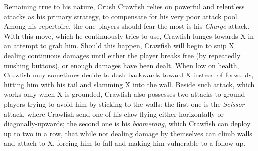 Remaining true to his nature, Crush Crawfish relies on powerful and relentless attacks as his primary strategy, to compensate for his  very poor attack pool. Among his repertoire, the one players should fear the most is his \emph{Charge} attack. With this move, which he continuously tries to use, Crawfish lunges towards X in an attempt to grab him. Should this happen, Crawfish will begin to snip X dealing continuous damages until either the player breaks free (by repeatedly mushing buttons), or enough damages have been dealt. When low on health, Crawfish may sometimes decide to dash backwards toward X instead of forwards, hitting him with his tail and slamming X into the wall. Beside such attack, which works only when X is grounded, Crawfish also possesses two attacks to ground players trying to avoid him by sticking to the walls: the first one is the \emph{Scissor} attack, where Crawfish send one of his claw flying either horizontally or diagonally-upwards; the second one is his \emph{boomerang}, which Crawfish can deploy up to two in a row, that while not dealing damage by themselves can climb walls and attach to X, forcing him to fall and making him vulnerable to a follow-up.

